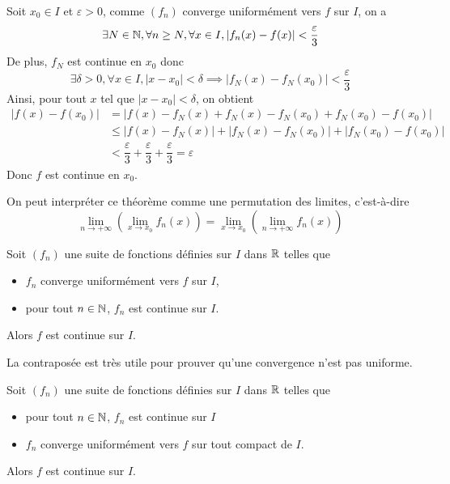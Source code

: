 \documentclass[a4paper,12pt]{article}
\begin{document}
\begin{demonstration}
    Soit $x_0 \in I$ et $\varepsilon > 0$, comme $(f_n)$ converge uniformément vers $f$ sur $I$, on a
    $$
    \exists N \in \mathbb{N}, \forall n \geq N, \forall x \in I, |f_n(x) - f(x)| < \dfrac{\varepsilon}{3}
    $$
    De plus, $f_N$ est continue en $x_0$ donc
    $$
    \exists \delta > 0, \forall x \in I, |x - x_0| < \delta \implies |f_N(x) - f_N(x_0)| < \dfrac{\varepsilon}{3}
    $$
    Ainsi, pour tout $x$ tel que $|x - x_0| < \delta$, on obtient
    \begin{align*}
        |f(x) - f(x_0)| &= |f(x) - f_N(x) + f_N(x) - f_N(x_0) + f_N(x_0) - f(x_0)| \\
        &\leq |f(x) - f_N(x)| + |f_N(x) - f_N(x_0)| + |f_N(x_0) - f(x_0)| \\
        &< \dfrac{\varepsilon}{3} + \dfrac{\varepsilon}{3} + \dfrac{\varepsilon}{3} = \varepsilon
    \end{align*}
    Donc $f$ est continue en $x_0$.
\end{demonstration}

\begin{remarque}
    On peut interpréter ce théorème comme une permutation des limites, c'est-à-dire
    $$
    \lim\limits_{n \to +\infty} (\lim\limits_{x \to x_0} f_n(x)) = \lim\limits_{x \to x_0} (\lim\limits_{n \to +\infty} f_n(x))
    $$
\end{remarque}

\begin{corollaire}{}{}
    Soit $(f_n)$ une suite de fonctions définies sur $I$ dans $\mathbb{R}$ telles que

    \begin{itemize}[label=--]
        \item $f_n$ converge uniformément vers $f$ sur $I$,
        \item pour tout $n \in \mathbb{N}$, $f_n$ est continue sur $I$.
    \end{itemize}
    Alors $f$ est continue sur $I$.
\end{corollaire}

\begin{remarque}
    La contraposée est très utile pour prouver qu'une convergence n'est pas uniforme.
\end{remarque}

\begin{proposition}{}{}
    Soit $(f_n)$ une suite de fonctions définies sur $I$ dans $\mathbb{R}$ telles que

    \begin{itemize}[label=--]
        \item pour tout $n \in \mathbb{N}$, $f_n$ est continue sur $I$
        \item $f_n$ converge uniformément vers $f$ sur tout compact de $I$.
    \end{itemize}
    Alors $f$ est continue sur $I$.
\end{proposition}
\end{document}
